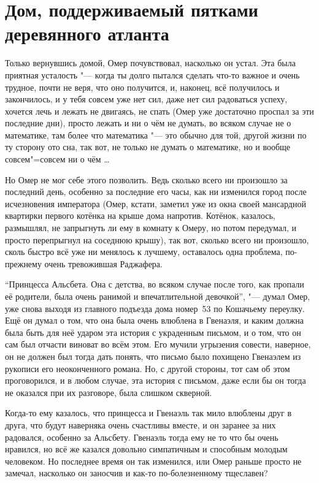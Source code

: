 \section{Дом, поддерживаемый пятками деревянного атланта}

Только вернувшись домой, Омер почувствовал, насколько он устал.
Эта была приятная усталость "--- когда ты долго пытался сделать что-то важное и
очень трудное, почти не веря, что оно получится, и, наконец, всё получилось и
закончилось, и у тебя совсем уже нет сил, даже нет сил радоваться успеху,
хочется лечь и лежать не двигаясь, не спать (Омер уже достаточно проспал за эти
последние дни), просто лежать и ни о чём не думать, во всяком случае не о
математике, там более что математика "--- это обычно для той, другой жизни по ту
сторону ото сна, так вот, не только не думать о математике, но и вообще
совсем"=совсем ни о чём \ldots

Но Омер не мог себе этого позволить.
Ведь сколько всего ни произошло за последний день, особенно за последние его
часы, как ни изменился город после исчезновения императора (Омер, кстати,
заметил уже из окна своей мансардной квартирки первого котёнка на крыше дома
напротив. Котёнок, казалось, размышлял, не запрыгнуть ли ему в комнату к Омеру,
но потом передумал, и просто перепрыгнул на соседнюю крышу), так вот, сколько
всего ни произошло, сколь быстро всё уже ни менялось к лучшему, оставалось одна
проблема, по-прежнему очень тревожившая Раджафера.

\enquote{Принцесса Альсбета.
Она с детства, во всяком случае после того, как пропали её родители, была очень
ранимой и впечатлительной девочкой}, "--- думал Омер, уже снова выходя из
главного подъезда дома номер~53 по Кошачьему переулку.
Ещё он думал о том, что она была очень влюблена в Гвенаэля, и каким должна была
быть для неё ударом эта история с украденным письмом, и о том, что он сам был
отчасти виноват во всём этом.
Его мучили угрызения совести, наверное, он не должен был тогда дать понять, что
письмо было похищено Гвенаэлем из рукописи его неоконченного романа.
Но, с другой стороны, тот сам об этом проговорился, и в любом случае, эта
история с письмом, даже если бы он тогда не оказался при их разговоре, была
слишком скверной.

Когда-то ему казалось, что принцесса и Гвенаэль так мило влюблены друг в друга,
что будут наверняка очень счастливы вместе, и он заранее за них радовался,
особенно за Альсбету.
Гвенаэль тогда ему не то что бы очень нравился, но всё же казался довольно
симпатичным и способным молодым человеком.
Но последнее время он так изменился, или Омер раньше просто не замечал,
насколько он заносчив и как-то по-болезненному тщеславен?

